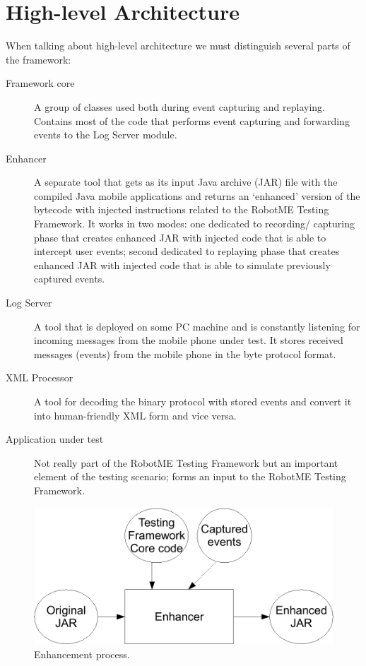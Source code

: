 \section{High-level Architecture}

When talking about high-level architecture we must distinguish several parts of the framework:

\begin{description}
    \item[Framework core] A group of classes used both during event capturing and
replaying. Contains most of the code that performs event capturing and forwarding 
events to the Log Server module.

    \item[Enhancer] A separate tool that gets as its input Java archive (JAR) file
with the compiled Java mobile applications and returns an `enhanced' version of the bytecode
with injected instructions related to the RobotME Testing Framework. 
It works in two modes: one dedicated to recording/ capturing phase that creates
enhanced JAR with injected code that is able to intercept user events;
second dedicated to replaying phase that creates enhanced JAR with injected code that
is able to simulate previously captured events.

    \item[Log Server] A tool that is deployed on some PC machine and is 
constantly listening for incoming messages from the mobile phone under test. It stores
received messages (events) from the mobile phone in the byte protocol format.

    \item[XML Processor] A tool for decoding the binary protocol
    with stored events and convert it into human-friendly XML form and vice versa.

    \item[Application under test] Not really part of the RobotME Testing Framework but an
    important element of the testing scenario; forms an input to the RobotME Testing Framework.
\end{description}

\begin{figure}[t]%
\begin{center}
\includegraphics[width=.5\linewidth]{figures/diagram1}
\end{center}
\caption{Enhancement process.}%
\label{fig:diagram1}
\end{figure}

